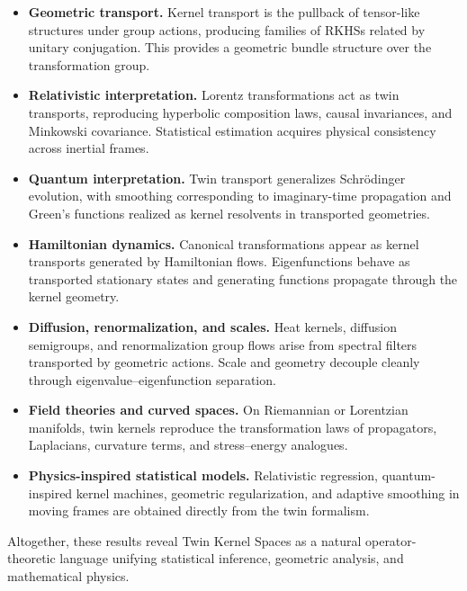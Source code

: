 \documentclass[11pt]{article}
\theoremstyle{definition}
\begin{document}
\begin{itemize}[itemsep=3pt]
	\item \textbf{Geometric transport.}  
	Kernel transport is the pullback of tensor-like structures under group actions, producing families of RKHSs related by unitary conjugation. This provides a geometric bundle structure over the transformation group.
	
	\item \textbf{Relativistic interpretation.}  
	Lorentz transformations act as twin transports, reproducing hyperbolic composition laws, causal invariances, and Minkowski covariance. Statistical estimation acquires physical consistency across inertial frames.
	
	\item \textbf{Quantum interpretation.}  
	Twin transport generalizes Schrödinger evolution, with smoothing corresponding to imaginary-time propagation and Green’s functions realized as kernel resolvents in transported geometries.
	
	\item \textbf{Hamiltonian dynamics.}  
	Canonical transformations appear as kernel transports generated by Hamiltonian flows. Eigenfunctions behave as transported stationary states and generating functions propagate through the kernel geometry.
	
	\item \textbf{Diffusion, renormalization, and scales.}  
	Heat kernels, diffusion semigroups, and renormalization group flows arise from spectral filters transported by geometric actions. Scale and geometry decouple cleanly through eigenvalue–eigenfunction separation.
	
	\item \textbf{Field theories and curved spaces.}  
	On Riemannian or Lorentzian manifolds, twin kernels reproduce the transformation laws of propagators, Laplacians, curvature terms, and stress–energy analogues.
	
	\item \textbf{Physics-inspired statistical models.}  
	Relativistic regression, quantum-inspired kernel machines, geometric regularization, and adaptive smoothing in moving frames are obtained directly from the twin formalism.
\end{itemize}

Altogether, these results reveal Twin Kernel Spaces as a natural operator-theoretic language unifying statistical inference, geometric analysis, and mathematical physics.
\end{document}
